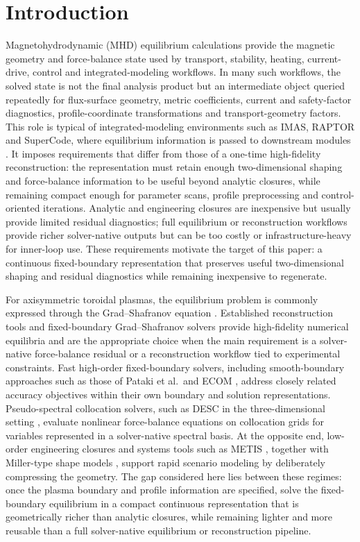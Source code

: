 \documentclass[final, 3p, times]{elsarticle}
\begin{document}
\section{Introduction}
\label{sec:introduction}

Magnetohydrodynamic (MHD) equilibrium calculations provide the magnetic geometry and force-balance state used by transport, stability, heating, current-drive, control and integrated-modeling workflows. In many such workflows, the solved state is not the final analysis product but an intermediate object queried repeatedly for flux-surface geometry, metric coefficients, current and safety-factor diagnostics, profile-coordinate transformations and transport-geometry factors. This role is typical of integrated-modeling environments such as IMAS, RAPTOR and SuperCode, where equilibrium information is passed to downstream modules \cite{Imbeaux2015,Felici2018,Haney1992}. It imposes requirements that differ from those of a one-time high-fidelity reconstruction: the representation must retain enough two-dimensional shaping and force-balance information to be useful beyond analytic closures, while remaining compact enough for parameter scans, profile preprocessing and control-oriented iterations. Analytic and engineering closures are inexpensive but usually provide limited residual diagnostics; full equilibrium or reconstruction workflows provide richer solver-native outputs but can be too costly or infrastructure-heavy for inner-loop use. These requirements motivate the target of this paper: a continuous fixed-boundary representation that preserves useful two-dimensional shaping and residual diagnostics while remaining inexpensive to regenerate.

For axisymmetric toroidal plasmas, the equilibrium problem is commonly expressed through the Grad--Shafranov equation \cite{Shafranov1966,GradRubin1958,Kruskal1958,Greene1971}. Established reconstruction tools and fixed-boundary Grad--Shafranov solvers provide high-fidelity numerical equilibria \cite{Lao1985,Lutjens1996,Palha2016,SanchezVizuet2019} and are the appropriate choice when the main requirement is a solver-native force-balance residual or a reconstruction workflow tied to experimental constraints. Fast high-order fixed-boundary solvers, including smooth-boundary approaches such as those of Pataki et al.\ and ECOM \cite{Pataki2013,Lee2015}, address closely related accuracy objectives within their own boundary and solution representations. Pseudo-spectral collocation solvers, such as DESC in the three-dimensional setting \cite{Dudt2020}, evaluate nonlinear force-balance equations on collocation grids for variables represented in a solver-native spectral basis. At the opposite end, low-order engineering closures and systems tools such as METIS \cite{Artaud2018}, together with Miller-type shape models \cite{Miller1998,Arbon2021,Snoep2023}, support rapid scenario modeling by deliberately compressing the geometry. The gap considered here lies between these regimes: once the plasma boundary and profile information are specified, solve the fixed-boundary equilibrium in a compact continuous representation that is geometrically richer than analytic closures, while remaining lighter and more reusable than a full solver-native equilibrium or reconstruction pipeline.
\end{document}
